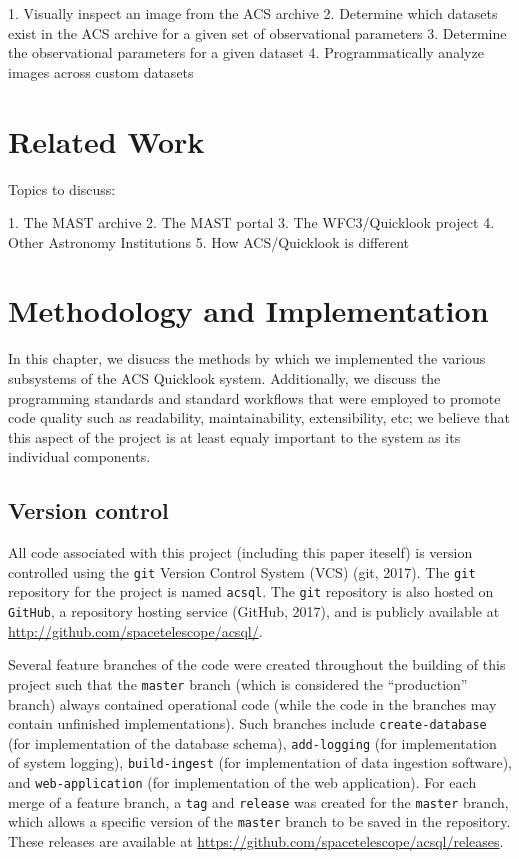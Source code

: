 \documentclass[10pt,journal,compsoc]{IEEEtran}
\begin{document}
1. Visually inspect an image from the ACS archive
2. Determine which datasets exist in the ACS archive for a given set of observational parameters
3. Determine the observational parameters for a given dataset
4. Programmatically analyze images across custom datasets


\section{Related Work}\label{sec:related_work}

Topics to discuss:

1. The MAST archive
2. The MAST portal
3. The WFC3/Quicklook project
4. Other Astronomy Institutions
5. How ACS/Quicklook is different


\section{Methodology and Implementation}\label{sec:methodology}

In this chapter, we disucss the methods by which we implemented the various subsystems
of the ACS Quicklook system.  Additionally, we discuss the programming standards and
standard workflows that were employed to promote code quality such as readability,
maintainability, extensibility, etc; we believe that this aspect of the project is
at least equaly important to the system as its individual components.


\subsection{Version control}

All code associated with this project (including this paper iteself) is version
controlled using the \texttt{git} Version Control System (VCS) (git, 2017).
The \texttt{git} repository for the project is named \texttt{acsql}.
The \texttt{git} repository is also hosted on \texttt{GitHub}, a repository
hosting service (GitHub, 2017), and is publicly available at
\url{http://github.com/spacetelescope/acsql/}.

Several feature branches of the code were created throughout the building of this project
such that the \texttt{master} branch (which is considered the ``production'' branch)
always contained operational code (while the code in the branches may contain unfinished
implementations).  Such branches include \texttt{create-database} (for implementation of
the database schema), \texttt{add-logging} (for implementation of system logging),
\texttt{build-ingest} (for implementation of data ingestion software), and
\texttt{web-application} (for implementation of the web application).  For each merge of a
feature branch, a \texttt{tag} and \texttt{release} was created for the \texttt{master} branch,
which allows a specific version of the \texttt{master} branch to be saved in the
repository.  These releases are available at
\url{https://github.com/spacetelescope/acsql/releases}.
\end{document}
